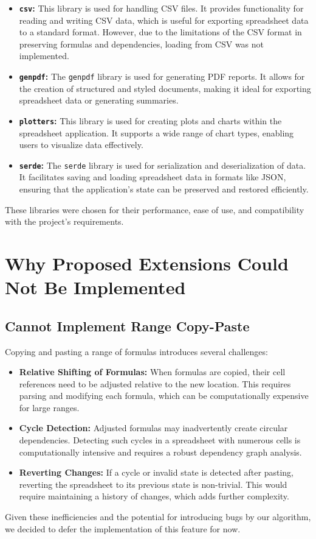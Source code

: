 \documentclass{article}
\begin{document}
\begin{itemize}
    \item \textbf{\texttt{csv}:} This library is used for handling CSV files. It provides functionality for reading and writing CSV data, which is useful for exporting spreadsheet data to a standard format. However, due to the limitations of the CSV format in preserving formulas and dependencies, loading from CSV was not implemented.
    \item \textbf{\texttt{genpdf}:} The \texttt{genpdf} library is used for generating PDF reports. It allows for the creation of structured and styled documents, making it ideal for exporting spreadsheet data or generating summaries.
    \item \textbf{\texttt{plotters}:} This library is used for creating plots and charts within the spreadsheet application. It supports a wide range of chart types, enabling users to visualize data effectively.
    \item \textbf{\texttt{serde}:} The \texttt{serde} library is used for serialization and deserialization of data. It facilitates saving and loading spreadsheet data in formats like JSON, ensuring that the application's state can be preserved and restored efficiently.
\end{itemize}

These libraries were chosen for their performance, ease of use, and compatibility with the project's requirements.

\section{Why Proposed Extensions Could Not Be Implemented}
\subsection{Cannot Implement Range Copy-Paste}
Copying and pasting a range of formulas introduces several challenges:
\begin{itemize}
    \item \textbf{Relative Shifting of Formulas:} When formulas are copied, their cell references need to be adjusted relative to the new location. This requires parsing and modifying each formula, which can be computationally expensive for large ranges.
    \item \textbf{Cycle Detection:} Adjusted formulas may inadvertently create circular dependencies. Detecting such cycles in a spreadsheet with numerous cells is computationally intensive and requires a robust dependency graph analysis.
    \item \textbf{Reverting Changes:} If a cycle or invalid state is detected after pasting, reverting the spreadsheet to its previous state is non-trivial. This would require maintaining a history of changes, which adds further complexity.
\end{itemize}
Given these inefficiencies and the potential for introducing bugs by our algorithm, we decided to defer the implementation of this feature for now.
\end{document}
